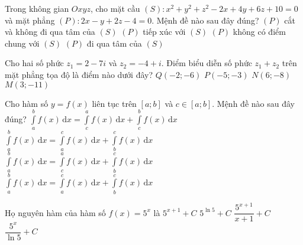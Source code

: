 \begin{ex}%
Trong không gian $Oxyz$, cho mặt cầu $(S)\colon x^2+y^2+z^2-2x+4y+6z+10=0$ và mặt phẳng $(P)\colon 2x-y+2z-4 = 0$. Mệnh đề nào sau đây đúng?
\choice
{$(P)$ cắt và không đi qua tâm của $(S)$}
{\True $(P)$ tiếp xúc với $(S)$}
{$(P)$ không có điểm chung với $(S)$}
{$(P)$ đi qua tâm của $(S)$}
\end{ex}

\begin{ex}%
Cho hai số phức $z_1=2-7i$ và $z_2=-4+i$. Điểm biểu diễn số phức $z_1+z_2$ trên mặt phẳng tọa độ là điểm nào dưới đây?
\choice
{\True $Q(-2;-6)$}
{$P(-5;-3)$}
{$N(6;-8)$}
{$M(3;-11)$}
\end{ex}

\begin{ex}%
Cho hàm số $y=f(x)$ liên tục trên $[a;b]$ và $c\in [a;b]$. Mệnh đề nào sau đây đúng?
\choice
{$\displaystyle\int\limits_a^b f(x) \mathrm{\,d}x = \displaystyle\int\limits_c^a f(x) \mathrm{\,d}x + \displaystyle\int\limits_c^b f(x) \mathrm{\,d}x$}
{$\displaystyle\int\limits_a^b f(x) \mathrm{\,d}x = \displaystyle\int\limits_a^c f(x) \mathrm{\,d}x + \displaystyle\int\limits_b^c f(x) \mathrm{\,d}x$}
{$\displaystyle\int\limits_a^b f(x) \mathrm{\,d}x = \displaystyle\int\limits_c^a f(x) \mathrm{\,d}x + \displaystyle\int\limits_b^c f(x) \mathrm{\,d}x$}
{\True $\displaystyle\int\limits_a^b f(x) \mathrm{\,d}x = \displaystyle\int\limits_a^c f(x) \mathrm{\,d}x + \displaystyle\int\limits_b^c f(x) \mathrm{\,d}x$}
\end{ex}

\begin{ex}%
Họ nguyên hàm của hàm số $f(x)=5^x$ là
\choice
{$5^{x+1}+C$}
{$5^{\ln 5} +C$}
{$\dfrac{5^{x+1}}{x+1}+C$}
{\True $\dfrac{5^x}{\ln 5}+C$}
\end{ex}

